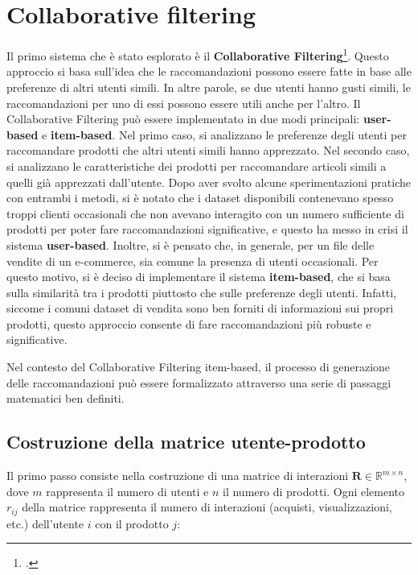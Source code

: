 \section{Collaborative filtering}

Il primo sistema che è stato esplorato è il \textbf{Collaborative Filtering}\footcite{site:collaborative-filtering}. Questo approccio si basa sull'idea che le raccomandazioni possono essere fatte in base alle preferenze di altri utenti simili. In altre parole, se due utenti hanno gusti simili, le raccomandazioni per uno di essi possono essere utili anche per l'altro. Il Collaborative Filtering può essere implementato in due modi principali: \textbf{user-based} e \textbf{item-based}. Nel primo caso, si analizzano le preferenze degli utenti per raccomandare prodotti che altri utenti simili hanno apprezzato. Nel secondo caso, si analizzano le caratteristiche dei prodotti per raccomandare articoli simili a quelli già apprezzati dall'utente. Dopo aver svolto alcune sperimentazioni pratiche con entrambi i metodi, si è notato che i dataset disponibili contenevano spesso troppi clienti occasionali che non avevano interagito con un numero sufficiente di prodotti per poter fare raccomandazioni significative, e questo ha messo in crisi il sistema \textbf{user-based}. Inoltre, si è pensato che, in generale, per un file delle vendite di un e-commerce, sia comune la presenza di utenti occasionali. Per questo motivo, si è deciso di implementare il sistema \textbf{item-based}, che si basa sulla similarità tra i prodotti piuttosto che sulle preferenze degli utenti. Infatti, siccome i comuni dataset di vendita sono ben forniti di informazioni sui propri prodotti, questo approccio consente di fare raccomandazioni più robuste e significative.

Nel contesto del Collaborative Filtering item-based, il processo di generazione delle raccomandazioni può essere formalizzato attraverso una serie di passaggi matematici ben definiti.

\subsection{Costruzione della matrice utente-prodotto}

Il primo passo consiste nella costruzione di una matrice di interazioni $\mathbf{R} \in \mathbb{R}^{m \times n}$, dove $m$ rappresenta il numero di utenti e $n$ il numero di prodotti. Ogni elemento $r_{ij}$ della matrice rappresenta il numero di interazioni (acquisti, visualizzazioni, etc.) dell'utente $i$ con il prodotto $j$:


